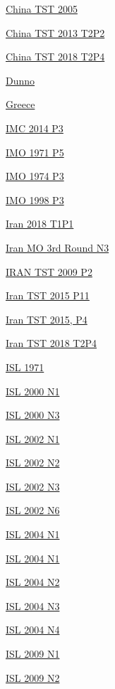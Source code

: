 \hyperref  [problem:China TST 2005]{China TST 2005}

\hyperref  [problem:China TST 2013 T2P2]{China TST 2013 T2P2}

\hyperref  [problem:China TST 2018 T2P4]{China TST 2018 T2P4}

\hyperref  [problem:Dunno]{Dunno}

\hyperref  [problem:Greece]{Greece}

\hyperref  [problem:IMC 2014 P3]{IMC 2014 P3}

\hyperref  [problem:IMO 1971 P5]{IMO 1971 P5}

\hyperref  [problem:IMO 1974 P3]{IMO 1974 P3}

\hyperref  [problem:IMO 1998 P3]{IMO 1998 P3}

\hyperref  [problem:Iran 2018 T1P1]{Iran 2018 T1P1}

\hyperref  [problem:Iran MO 3rd Round N3]{Iran MO 3rd Round N3}

\hyperref  [problem:IRAN TST 2009 P2]{IRAN TST 2009 P2}

\hyperref  [problem:Iran TST 2015 P11]{Iran TST 2015 P11}

\hyperref  [problem:Iran TST 2015, P4]{Iran TST 2015, P4}

\hyperref  [problem:Iran TST 2018 T2P4]{Iran TST 2018 T2P4}

\hyperref  [problem:ISL 1971]{ISL 1971}

\hyperref  [problem:ISL 2000 N1]{ISL 2000 N1}

\hyperref  [problem:ISL 2000 N3]{ISL 2000 N3}

\hyperref  [problem:ISL 2002 N1]{ISL 2002 N1}

\hyperref  [problem:ISL 2002 N2]{ISL 2002 N2}

\hyperref  [problem:ISL 2002 N3]{ISL 2002 N3}

\hyperref  [problem:ISL 2002 N6]{ISL 2002 N6}

\hyperref  [problem:ISL 2004 N1]{ISL 2004 N1}

\hyperref  [problem:ISL 2004 N1]{ISL 2004 N1}

\hyperref  [problem:ISL 2004 N2]{ISL 2004 N2}

\hyperref  [problem:ISL 2004 N3]{ISL 2004 N3}

\hyperref  [problem:ISL 2004 N4]{ISL 2004 N4}

\hyperref  [problem:ISL 2009 N1]{ISL 2009 N1}

\hyperref  [problem:ISL 2009 N2]{ISL 2009 N2}

